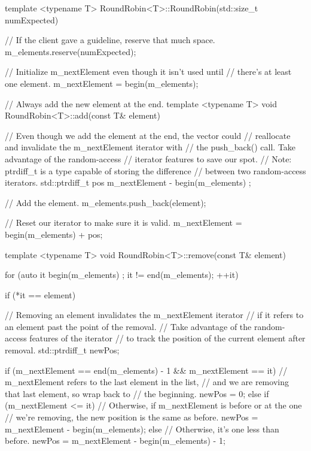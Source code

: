 \begin{cpp}
template <typename T> RoundRobin<T>::RoundRobin(std::size_t numExpected)
{
    // If the client gave a guideline, reserve that much space.
    m_elements.reserve(numExpected);

    // Initialize m_nextElement even though it isn't used until
    // there's at least one element.
    m_nextElement = begin(m_elements);
}

// Always add the new element at the end.
template <typename T> void RoundRobin<T>::add(const T& element)
{
    // Even though we add the element at the end, the vector could
    // reallocate and invalidate the m_nextElement iterator with
    // the push_back() call. Take advantage of the random-access
    // iterator features to save our spot.
    // Note: ptrdiff_t is a type capable of storing the difference
    //  between two random-access iterators.
    std::ptrdiff_t pos { m_nextElement - begin(m_elements) };

    // Add the element.
    m_elements.push_back(element);

    // Reset our iterator to make sure it is valid.
    m_nextElement = begin(m_elements) + pos;
}

template <typename T> void RoundRobin<T>::remove(const T& element)
{
    for (auto it { begin(m_elements) }; it != end(m_elements); ++it) {
        if (*it == element) {
            // Removing an element invalidates the m_nextElement iterator
            // if it refers to an element past the point of the removal.
            // Take advantage of the random-access features of the iterator
            // to track the position of the current element after removal.
            std::ptrdiff_t newPos;

            if (m_nextElement == end(m_elements) - 1 &&
                m_nextElement == it) {
                    // m_nextElement refers to the last element in the list,
                    // and we are removing that last element, so wrap back to
                    // the beginning.
                    newPos = 0;
                } else if (m_nextElement <= it) {
                    // Otherwise, if m_nextElement is before or at the one
                    // we're removing, the new position is the same as before.
                    newPos = m_nextElement - begin(m_elements);
                } else {
                    // Otherwise, it's one less than before.
                    newPos = m_nextElement - begin(m_elements) - 1;
                }

}}}
\end{cpp}
